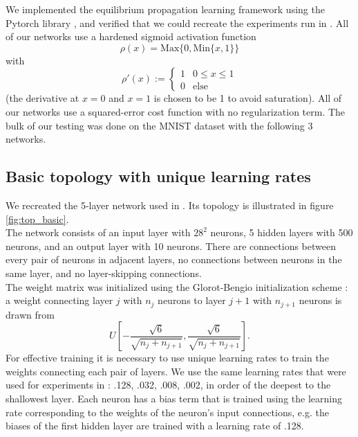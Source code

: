\documentclass{article}
\newcommand{\npar}{\\\indent}
\begin{document}
We implemented the equilibrium propagation learning framework \cite{scellier17} using the Pytorch library \cite{pytorch}, and verified that we could recreate the experiments run in \cite{scellier17}. All of our networks use a hardened sigmoid activation function 
\begin{equation}
\label{eqn:hardened_sigmoid}
\rho(x)=\text{Max}\{0, \text{Min}\{x, 1\}\}
\end{equation} with 
\begin{equation}\rho'(x):=\begin{cases}1 & 0\leq x \leq 1 \\ 0 & \text{else}\end{cases}\end{equation}
(the derivative at $x=0$ and $x=1$ is chosen to be 1 to avoid saturation). All of our networks use a squared-error cost function with no regularization term. The bulk of our testing was done on the MNIST dataset \cite{mnist1998} with the following 3 networks.

\subsection{Basic topology with unique learning rates}
\label{sec:basic_topology}

We recreated the 5-layer network used in \cite{scellier17}. Its topology is illustrated in figure \ref{fig:top_basic}.
\npar
The network consists of an input layer with $28^2$ neurons, 5 hidden layers with 500 neurons, and an output layer with 10 neurons. There are connections between every pair of neurons in adjacent layers, no connections between neurons in the same layer, and no layer-skipping connections.
\npar
The weight matrix was initialized using the Glorot-Bengio initialization scheme \cite{glorot10}: a weight connecting layer $j$ with $n_j$ neurons to layer $j+1$ with $n_{j+1}$ neurons is drawn from 
\begin{equation}
\label{eqn:gb_init}
U[-\frac{\sqrt{6}}{\sqrt{n_j+n_{j+1}}},\frac{\sqrt{6}}{\sqrt{n_j+n_{j+1}}}].
\end{equation}
For effective training it is necessary to use unique learning rates to train the weights connecting each pair of layers. We use the same learning rates that were used for experiments in \cite{scellier17}: .128, .032, .008, .002, in order of the deepest to the shallowest layer. Each neuron has a bias term that is trained using the learning rate corresponding to the weights of the neuron's input connections, e.g. the biases of the first hidden layer are trained with a learning rate of .128.
\end{document}
